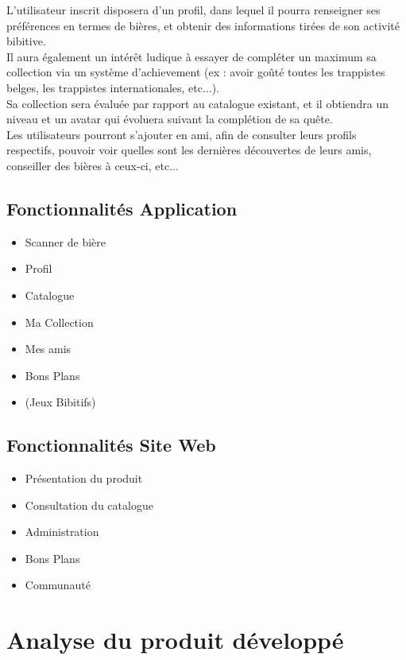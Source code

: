\documentclass{report}
\begin{document}
		L'utilisateur inscrit disposera d'un profil, dans lequel il pourra renseigner ses préférences en termes de bières, et obtenir des informations tirées de son activité bibitive.\\

		Il aura également un intérêt ludique à essayer de compléter un maximum sa collection via un système d'achievement (ex : avoir goûté toutes les trappistes belges, les trappistes internationales, etc...).\\
		Sa collection sera évaluée par rapport au catalogue existant, et il obtiendra un niveau et un avatar qui évoluera suivant la complétion de sa quête.\\

		Les utilisateurs pourront s'ajouter en ami, afin de consulter leurs profils respectifs, pouvoir voir quelles sont les dernières découvertes de leurs amis, conseiller des bières à ceux-ci, etc...\\

	\section{Fonctionnalités Application}

		\begin{itemize}
			\item Scanner de bière
			\item Profil
			\item Catalogue
			\item Ma Collection
			\item Mes amis
			\item Bons Plans
			\item (Jeux Bibitifs)
		\end{itemize}

	\section{Fonctionnalités Site Web}

		\begin{itemize}
			\item Présentation du produit
			\item Consultation du catalogue
			\item Administration
			\item Bons Plans
			\item Communauté
		\end{itemize}


\chapter{Analyse du produit développé} %
\end{document}
